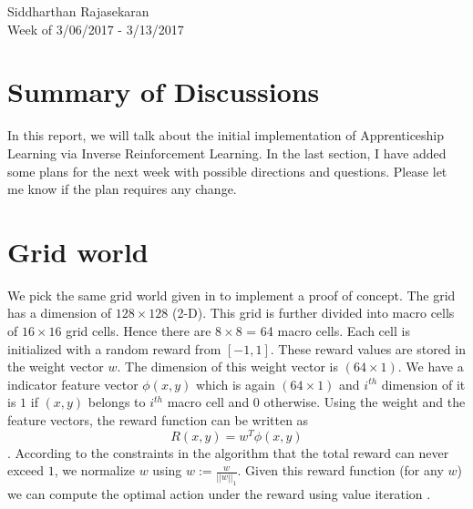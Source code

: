 \documentclass{article}[11pt]
\begin{document}
\begin{center}
Siddharthan Rajasekaran\\
Week of 3/06/2017 - 3/13/2017
\end{center}

\section{Summary of Discussions}
In this report, we will talk about the initial implementation of Apprenticeship Learning via Inverse Reinforcement Learning. In the last section, I have added some plans for the next week with possible directions and questions. Please let me know if the plan requires any change. 

\section{Grid world}
We pick the same grid world given in \cite{abbeel2004apprenticeship} to implement a proof of concept. The grid has a dimension of $128 \times 128$ (2-D). This grid is further divided into macro cells of $16 \times 16$ grid cells. Hence there are $8\times8$ = 64 macro cells. Each cell is initialized with a random reward from $[-1,1]$. These reward values are stored in the weight vector $w$. The dimension of this weight vector is $(64\times 1)$. We have a indicator feature vector $\phi(x,y)$ which is again $(64\times 1)$ and $i^{th}$ dimension of it is $1$ if $(x,y)$ belongs to $i^{th}$ macro cell and $0$ otherwise. Using the weight and the feature vectors, the reward function can be written as $$R(x,y) = w^T\phi(x,y)$$. According to the constraints in the algorithm that the total reward can never exceed $1$, we normalize $w$ using $w := \frac{w}{||w||_1}$. Given this reward function (for any $w$) we can compute the optimal action under the reward using value iteration \cite{russell1995modern}.
\end{document}
